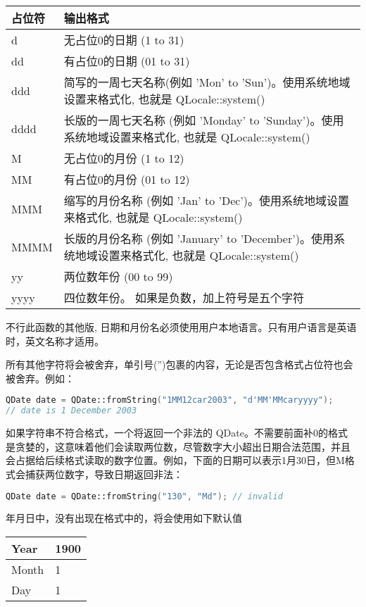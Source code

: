 \begin{tabular}{|l|l|}
\hline
占位符&	输出格式\\
\hline
d&	无占位0的日期 (1 to 31)\\
\hline
dd&	有占位0的日期 (01 to 31)\\
\hline
ddd&	简写的一周七天名称(例如 'Mon' to 'Sun')。使用系统地域设置来格式化, 也就是 QLocale::system()\\
\hline
dddd&	长版的一周七天名称 (例如 'Monday' to 'Sunday')。使用系统地域设置来格式化, 也就是 QLocale::system()\\
\hline
M&	无占位0的月份 (1 to 12)\\
\hline
MM&	有占位0的月份 (01 to 12)\\
\hline
MMM&	缩写的月份名称 (例如 'Jan' to 'Dec')。使用系统地域设置来格式化, 也就是 QLocale::system()\\
\hline
MMMM&	长版的月份名称 (例如 'January' to 'December')。使用系统地域设置来格式化, 也就是 QLocale::system()\\
\hline
yy&	两位数年份 (00 to 99)\\
\hline
yyyy&	四位数年份。 如果是负数，加上符号是五个字符\\
\hline
\end{tabular}

\begin{notice}
 不行此函数的其他版, 日期和月份名必须使用用户本地语言。只有用户语言是英语时，英文名称才适用。
\end{notice}

所有其他字符将会被舍弃，单引号('')包裹的内容，无论是否包含格式占位符也会被舍弃。例如：

\begin{lstlisting}[language=C++]
QDate date = QDate::fromString("1MM12car2003", "d'MM'MMcaryyyy");
// date is 1 December 2003
\end{lstlisting}

如果字符串不符合格式，一个将返回一个非法的 QDate。不需要前面补0的格式
是贪婪的，这意味着他们会读取两位数，尽管数字大小超出日期合法范围，并且
会占据给后续格式读取的数字位置。例如，下面的日期可以表示1月30日，但M格
式会捕获两位数字，导致日期返回非法：

\begin{lstlisting}[language=C++]
QDate date = QDate::fromString("130", "Md"); // invalid
\end{lstlisting}

年月日中，没有出现在格式中的，将会使用如下默认值

\begin{tabular}{|l|l|}
\hline
Year&	1900\\
\hline
Month&	1\\
\hline
Day&	1\\
\hline
\end{tabular}

